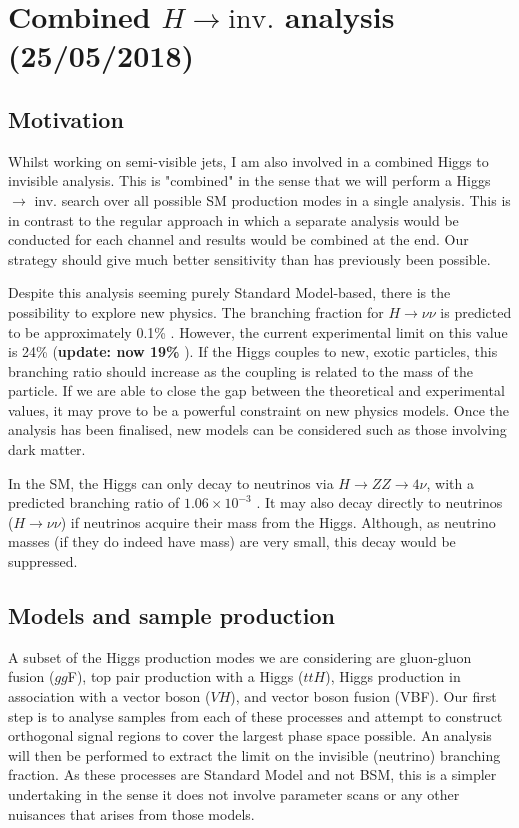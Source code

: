 \newpage
\chapter{Combined \texorpdfstring{$H \rightarrow \mathrm{inv.}$}{Higgs to invisible} analysis (25/05/2018)}

\section{Motivation}

Whilst working on semi-visible jets, I am also involved in a combined Higgs to invisible analysis. This is "combined" in the sense that we will perform a Higgs $\rightarrow$ inv. search over all possible SM production modes in a single analysis. This is in contrast to the regular approach in which a separate analysis would be conducted for each channel and results would be combined at the end. Our strategy should give much better sensitivity than has previously been possible.

Despite this analysis seeming purely Standard Model-based, there is the possibility to explore new physics. The branching fraction for $H \rightarrow \nu\nu$ is predicted to be approximately 0.1\% \cite{Heinemeyer:1559921}. However, the current experimental limit on this value is 24\% \cite{Khachatryan:2016whc} (\textbf{update: now 19\%} \cite{Sirunyan:2018owy}). If the Higgs couples to new, exotic particles, this branching ratio should increase as the coupling is related to the mass of the particle. If we are able to close the gap between the theoretical and experimental values, it may prove to be a powerful constraint on new physics models. Once the analysis has been finalised, new models can be considered such as those involving dark matter.

In the SM, the Higgs can only decay to neutrinos via $H \rightarrow ZZ \rightarrow 4\nu$, with a predicted branching ratio of $1.06 \times 10^{-3}$ \cite{Heinemeyer:1559921}. It may also decay directly to neutrinos ($H \rightarrow \nu\nu$) if neutrinos acquire their mass from the Higgs. Although, as neutrino masses (if they do indeed have mass) are very small, this decay would be suppressed.


\section{Models and sample production}

A subset of the Higgs production modes we are considering are gluon-gluon fusion ($gg$F), top pair production with a Higgs ($ttH$), Higgs production in association with a vector boson ($VH$), and vector boson fusion (VBF). Our first step is to analyse samples from each of these processes and attempt to construct orthogonal signal regions to cover the largest phase space possible. An analysis will then be performed to extract the limit on the invisible (neutrino) branching fraction. As these processes are Standard Model and not BSM, this is a simpler undertaking in the sense it does not involve parameter scans or any other nuisances that arises from those models.

